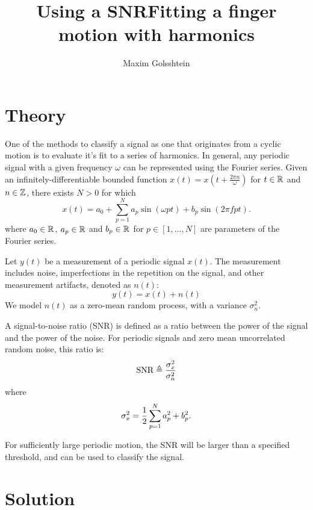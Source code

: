 \documentclass[11pt,letterpaper]{article}
\author{Maxim Golsshtein}
\title{Using a SNRFitting a finger motion with harmonics}
\newcommand{\SNR}{\mathrm{SNR}}
\begin{document}
	\maketitle
	
	\section{Theory}
	
	One of the methods to classify a signal as one that originates from a cyclic motion is to evaluate it's fit to a series of harmonics. In general, any periodic signal with a given frequency $\omega$ can be represented using the Fourier series. Given an infinitely-differentiable bounded function $x(t) = x(t+\frac{2\pi n}{\omega})$ for $t\in\mathbb{R}^{}$ and $n\in\mathbb{Z}{}$, there exists $N>0$ for which 
	\begin{equation}\label{key}
	x(t) = a_0 + \sum_{p=1}^{N} a_p \sin(\omega p t) + b_p \sin(2\pi f p t).
	\end{equation}
	where $a_0 \in \mathbb{R}^{}$, $a_p \in \mathbb{R}^{}$ and $b_p \in \mathbb{R}^{}$ for $p \in [1, ..., N]$ are parameters of the Fourier series.
	
	Let $y(t)$ be a measurement of a periodic signal $x(t)$. The measurement includes noise, imperfections in the repetition on the signal, and other measurement artifacts, denoted as $n(t)$:
	\begin{equation}\label{key}
	y(t) = x(t) + n(t)
	\end{equation}
	We model $n(t)$ as a zero-mean random process, with a variance $\sigma_n^2$.
	
	A signal-to-noise ratio (SNR) is defined as a ratio between the power of the signal and the power of the noise. For periodic signals and zero mean uncorrelated random noise, this ratio is: 
	\begin{equation}\label{key}
		 \SNR \dfn \frac{\sigma_x^2}{\sigma_n^2}
	\end{equation}
	where 
	\begin{equation}\label{key}
		\sigma_x^2 = \frac{1}{2}\sum_{p=1}^{N} a_p^2 + b_p^2.
	\end{equation}
		
	For sufficiently large periodic motion, the SNR will be larger than a specified threshold, and can be used to classify the signal. 
	
	\section{Solution}
	
\end{document}
